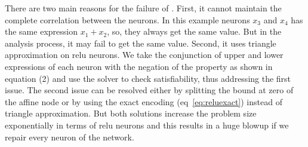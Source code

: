 \hspace*{-1cm}
\quad
{}  

There are two main reasons for the failure of \deeppoly{}. First, it cannot maintain the complete correlation 
between the neurons. In this example neurons $x_3$ and $x_4$ has the same expression $x_1+x_2$, so, they always
get the same value. But in the \deeppoly{} analysis process, it may fail to get the same value. Second, it uses triangle
approximation on relu neurons.
We take the conjunction of upper and lower expressions of each neuron with the negation of the property
as shown in equation (2)%
 and use the \milp{} solver to check satisfiability, thus addressing the first issue.  
The second issue can be resolved either by splitting the bound at zero of the 
affine node or by using the exact encoding (eq~\ref{eq:reluexact}) 
instead of triangle approximation. 
But both solutions increase the problem size exponentially in terms of relu neurons and this results in a huge 
blowup if we repair every neuron of the network. 

